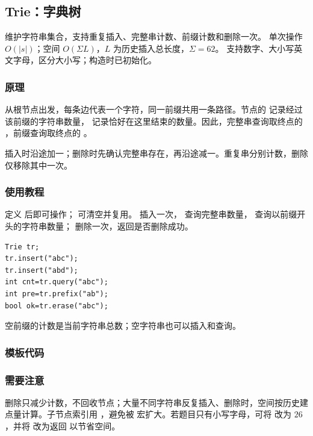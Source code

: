 \subsection{Trie：字典树}
\label{algo:trie}
\AlgorithmInfo
    {维护字符串集合，支持重复插入、完整串计数、前缀计数和删除一次。}
    {单次操作 $O(|s|)$；空间 $O(\Sigma L)$，$L$ 为历史插入总长度，$\Sigma=62$。}
    {支持数字、大小写英文字母，区分大小写；构造时已初始化。}

\subsubsection*{原理}
从根节点出发，每条边代表一个字符，同一前缀共用一条路径。节点的  记录经过该前缀的字符串数量， 记录恰好在这里结束的数量。因此，完整串查询取终点的 ，前缀查询取终点的 。

插入时沿途加一；删除时先确认完整串存在，再沿途减一。重复串分别计数，删除仅移除其中一次。

\subsubsection*{使用教程}
定义  后即可操作； 可清空并复用。 插入一次， 查询完整串数量， 查询以前缀开头的字符串数量； 删除一次，返回是否删除成功。
\begin{lstlisting}[style=mtycpp,numbers=none]
Trie tr;
tr.insert("abc");
tr.insert("abd");
int cnt=tr.query("abc");
int pre=tr.prefix("ab");
bool ok=tr.erase("abc");
\end{lstlisting}
空前缀的计数是当前字符串总数；空字符串也可以插入和查询。

\subsubsection*{模板代码}

\subsubsection*{需要注意}
删除只减少计数，不回收节点；大量不同字符串反复插入、删除时，空间按历史建点量计算。子节点索引用 ，避免被  宏扩大。若题目只有小写字母，可将  改为 $26$，并将  改为返回  以节省空间。
